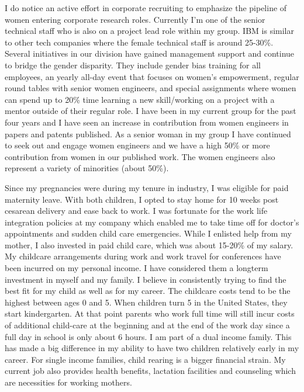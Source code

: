 \documentclass[utf8]{frontiersSCNS} %
\begin{document}
I do notice an active effort in corporate recruiting to emphasize the pipeline of women entering corporate research roles. Currently I’m one of the senior technical staff who is also on a project lead role within my group. IBM is similar to other tech companies where the female technical staff is around 25-30\%.  Several initiatives in our division have gained management support and continue to bridge the gender disparity. They include gender bias training for all employees, an yearly all-day event that focuses on women’s empowerment, regular round tables with senior women engineers, and special assignments where women can spend up to 20\% time learning a new skill/working on a project with a mentor outside of their regular role. I have been in my current group for the past four years and I have seen an increase in contribution from women engineers in papers and patents published. As a senior woman in my group I have continued to seek out and engage women engineers and we have a high 50\% or more contribution from women in our published work. The women engineers also represent a variety of minorities (about 50\%).

Since my pregnancies were during my tenure in industry, I was eligible for paid maternity leave. With both children, I opted to stay home for 10 weeks post cesarean delivery and ease back to work. I was fortunate for the work life integration policies at my company which enabled me to take time off for doctor’s appointments and sudden child care emergencies. While I enlisted help from my mother, I also invested in paid child care, which was about 15-20\% of my salary. My childcare arrangements during work and work travel for conferences have been incurred on my personal income. I have considered them a longterm investment in myself and my family. I believe in consistently trying to find the best fit for my child as well as for my career.  The childcare costs tend to be the highest between ages 0 and 5. When children turn 5 in the United States, they start kindergarten. At that point parents who work full time will still incur costs of additional child-care at the beginning and at the end of the work day since a full day in school is only about 6 hours.  I am part of a dual income family. This has made a big difference in my ability to have two children relatively early in my career. For single income families, child rearing is a bigger financial strain. My current job also provides health benefits, lactation facilities and counseling which are necessities for working mothers.
\end{document}
